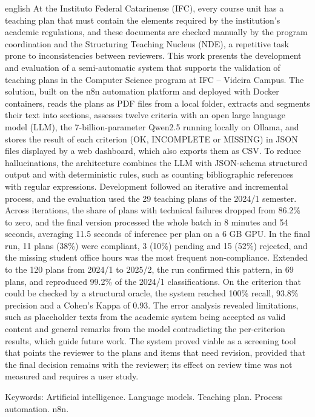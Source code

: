 \begin{resumo}[Abstract]
\begin{otherlanguage*}{english}
\noindent
At the Instituto Federal Catarinense (IFC), every course unit has a teaching plan that must contain the elements required by the institution's academic regulations, and these documents are checked manually by the program coordination and the Structuring Teaching Nucleus (NDE), a repetitive task prone to inconsistencies between reviewers. This work presents the development and evaluation of a semi-automatic system that supports the validation of teaching plans in the Computer Science program at IFC -- Videira Campus. The solution, built on the n8n automation platform and deployed with Docker containers, reads the plans as PDF files from a local folder, extracts and segments their text into sections, assesses twelve criteria with an open large language model (LLM), the 7-billion-parameter Qwen2.5 running locally on Ollama, and stores the result of each criterion (OK, INCOMPLETE or MISSING) in JSON files displayed by a web dashboard, which also exports them as CSV. To reduce hallucinations, the architecture combines the LLM with JSON-schema structured output and with deterministic rules, such as counting bibliographic references with regular expressions. Development followed an iterative and incremental process, and the evaluation used the 29 teaching plans of the 2024/1 semester. Across iterations, the share of plans with technical failures dropped from 86.2\% to zero, and the final version processed the whole batch in 8 minutes and 54 seconds, averaging 11.5 seconds of inference per plan on a 6 GB GPU. In the final run, 11 plans (38\%) were compliant, 3 (10\%) pending and 15 (52\%) rejected, and the missing student office hours was the most frequent non-compliance. Extended to the 120 plans from 2024/1 to 2025/2, the run confirmed this pattern, in 69 plans, and reproduced 99.2\% of the 2024/1 classifications. On the criterion that could be checked by a structural oracle, the system reached 100\% recall, 93.8\% precision and a Cohen's Kappa of 0.93. The error analysis revealed limitations, such as placeholder texts from the academic system being accepted as valid content and general remarks from the model contradicting the per-criterion results, which guide future work. The system proved viable as a screening tool that points the reviewer to the plans and items that need revision, provided that the final decision remains with the reviewer; its effect on review time was not measured and requires a user study.

\vspace{0.2cm}
\noindent Keywords: Artificial intelligence. Language models. Teaching plan. Process automation. n8n.
\end{otherlanguage*}
\end{resumo}
